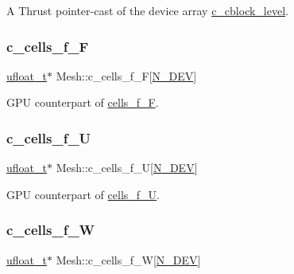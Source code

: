 A Thrust pointer-\/cast of the device array \hyperlink{classMesh_a883a91c4cf0446f344115ccbb3bc2f65}{c\+\_\+cblock\+\_\+level}. 

\mbox{\label{classMesh_a68efba812fdabe68df7d1b0572fa7771}} 
\subsubsection{\texorpdfstring{c\+\_\+cells\+\_\+f\+\_\+F}{c\_cells\_f\_F}}
{\footnotesize\ttfamily \hyperlink{cppspec_8h_af529d360dfac9b9578aa719418a53a21}{ufloat\+\_\+t}$\ast$ Mesh\+::c\+\_\+cells\+\_\+f\+\_\+F\mbox{[}\hyperlink{cppspec_8h_a2b674dab7a14f1bf32b48b7fda5022dc}{N\+\_\+\+D\+EV}\mbox{]}}



G\+PU counterpart of \hyperlink{classMesh_af25ca4c4bc4150feb9b5d6652f8f8819}{cells\+\_\+f\+\_\+F}. 

\mbox{\label{classMesh_a673b065e1b3566b67357462d19ccb22b}} 
\subsubsection{\texorpdfstring{c\+\_\+cells\+\_\+f\+\_\+U}{c\_cells\_f\_U}}
{\footnotesize\ttfamily \hyperlink{cppspec_8h_af529d360dfac9b9578aa719418a53a21}{ufloat\+\_\+t}$\ast$ Mesh\+::c\+\_\+cells\+\_\+f\+\_\+U\mbox{[}\hyperlink{cppspec_8h_a2b674dab7a14f1bf32b48b7fda5022dc}{N\+\_\+\+D\+EV}\mbox{]}}



G\+PU counterpart of \hyperlink{classMesh_a242518ffb09784e8a6c6ebb13c4ec039}{cells\+\_\+f\+\_\+U}. 

\mbox{\label{classMesh_aa148542495502c0c42dfb462d6f41f02}} 
\subsubsection{\texorpdfstring{c\+\_\+cells\+\_\+f\+\_\+W}{c\_cells\_f\_W}}
{\footnotesize\ttfamily \hyperlink{cppspec_8h_af529d360dfac9b9578aa719418a53a21}{ufloat\+\_\+t}$\ast$ Mesh\+::c\+\_\+cells\+\_\+f\+\_\+W\mbox{[}\hyperlink{cppspec_8h_a2b674dab7a14f1bf32b48b7fda5022dc}{N\+\_\+\+D\+EV}\mbox{]}}



